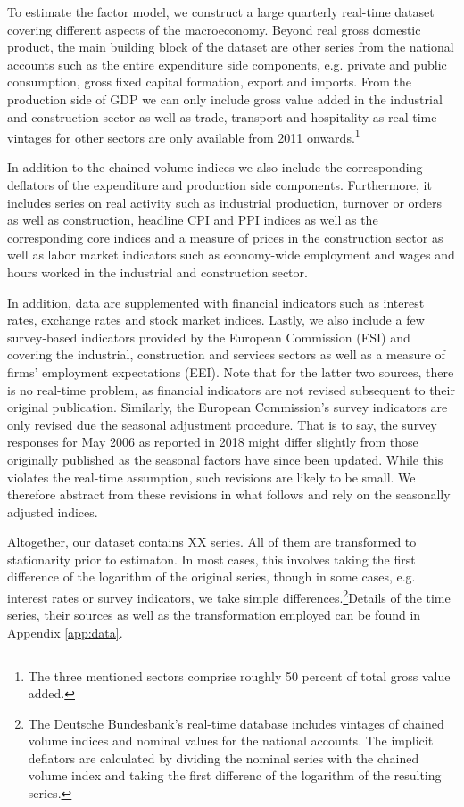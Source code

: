 \documentclass[notitlepage,a4paper,12pt]{article}
\begin{document}
To estimate the factor model, we construct a large quarterly real-time dataset covering different aspects of the macroeconomy. Beyond real gross domestic product, the main building block of the dataset are other series from the national accounts such as the entire expenditure side components, e.g. private and public consumption, gross fixed capital formation, export and imports. From the production side of GDP we can only include gross value added in the industrial and construction sector as well as trade, transport and hospitality as real-time vintages for other sectors are only available from 2011 onwards.\footnote{The three mentioned sectors comprise roughly 50 percent of total gross value added.} 

In addition to the chained volume indices we also include the corresponding deflators of the expenditure and production side components. Furthermore, it includes series on real activity such as industrial production, turnover or orders as well as construction, headline CPI and PPI indices as well as the corresponding core indices and a measure of prices in the construction sector as well as labor market indicators such as economy-wide employment and wages and hours worked in the industrial and construction sector.    

In addition, data are supplemented with financial indicators such as interest rates, exchange rates and stock market indices. Lastly, we also include a few survey-based indicators provided by the European Commission (ESI) and covering the industrial, construction and services sectors as well as a measure of firms' employment expectations (EEI). Note that for the latter two sources, there is no real-time problem, as financial indicators are not revised subsequent to their original publication. Similarly, the European Commission's survey indicators are only revised due the seasonal adjustment procedure. That is to say, the survey responses for May 2006 as reported in 2018 might differ slightly from those originally published as the seasonal factors have since been updated. While this violates the real-time assumption, such revisions are likely to be small. We therefore abstract from these revisions in what follows  and rely on the seasonally adjusted indices.

Altogether, our dataset contains XX series. All of them are transformed to stationarity prior to estimaton. In most cases, this involves taking the first difference of the logarithm of the original series, though in some cases, e.g. interest rates or survey indicators, we take simple differences.\footnote{The Deutsche Bundesbank's real-time database includes vintages of chained volume indices and nominal values for the national accounts. The implicit deflators are calculated by dividing the nominal series with the chained volume index and taking the first differenc of the logarithm of the resulting series.}Details of the time series, their sources as well as the transformation employed  can be found in Appendix \ref{app:data}.
\end{document}
